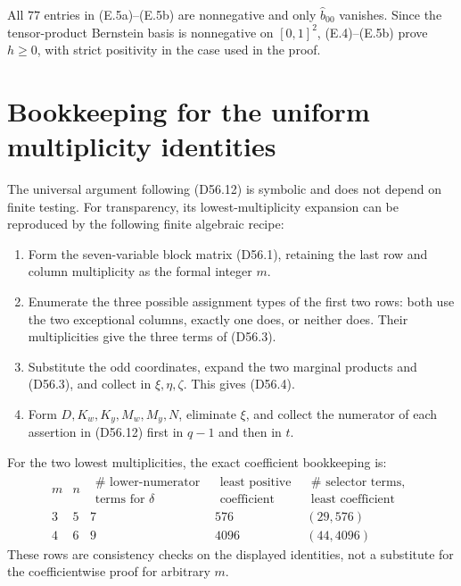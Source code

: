 \documentclass[10pt,a4paper]{amsart}
\theoremstyle{definition}
\theoremstyle{remark}
\newenvironment{exacttable}
  {\begingroup\small
   \setlength{\arraycolsep}{4pt}%
   \renewcommand{\arraystretch}{1.12}}
  {\endgroup}
\begin{document}
All \(77\) entries in (E.5a)--(E.5b) are nonnegative and only
\(\widehat b_{00}\) vanishes.  Since the tensor-product Bernstein basis is
nonnegative on \([0,1]^2\), (E.4)--(E.5b) prove \(h\geq0\), with strict
positivity in the case used in the proof.

\section{Bookkeeping for the uniform multiplicity identities}
\label{app:uniform-bookkeeping}

The universal argument following (D56.12) is symbolic and does not depend
on finite testing.  For transparency, its lowest-multiplicity expansion can
be reproduced by the following finite algebraic recipe:

\begin{enumerate}
\item Form the seven-variable block matrix (D56.1), retaining the last
  row and column multiplicity as the formal integer \(m\).
\item Enumerate the three possible assignment types of the first two rows:
  both use the two exceptional columns, exactly one does, or neither does.
  Their multiplicities give the three terms of (D56.3).
\item Substitute the odd coordinates, expand the two marginal products and
  (D56.3), and collect in \(\xi,\eta,\zeta\).  This gives (D56.4).
\item Form \(D,K_w,K_y,M_w,M_y,N\), eliminate \(\xi\), and collect the
  numerator of each assertion in (D56.12) first in \(q-1\) and then in
  \(t\).
\end{enumerate}

For the two lowest multiplicities, the exact coefficient bookkeeping is:
\begin{exacttable}
\[
\begin{array}{c|c|c|c|c}
m&n&
\begin{gathered}\#\text{ lower-numerator}\\[-2pt]\text{terms for }\delta\end{gathered}
&\begin{gathered}\text{least positive}\\[-2pt]\text{coefficient}\end{gathered}
&\begin{gathered}\#\text{ selector terms},\\[-2pt]\text{least coefficient}\end{gathered}\\ \hline
3&5&7&576&(29,576)\\
4&6&9&4096&(44,4096)
\end{array}
\tag{F.1}
\]
\end{exacttable}
These rows are consistency checks on the displayed identities, not a
substitute for the coefficientwise proof for arbitrary \(m\).
\end{document}
